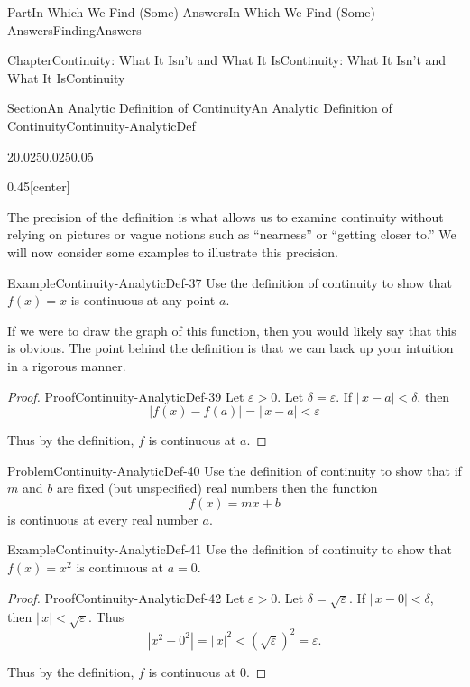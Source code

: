\documentclass[oneside,10pt,]{book}
\numberwithin{equation}{part}
\newcommand{\abs}[1]{\left|#1\right|}
\newcommand{\eps}{\varepsilon}
\newcommand{\lt}{<}
\begin{document}
\begin{partptx}{Part}{In Which We Find (Some) Answers}{}{In Which We Find (Some) Answers}{}{}{FindingAnswers}
\begin{chapterptx}{Chapter}{Continuity: What It Isn't and What It Is}{}{Continuity: What It Isn't and What It Is}{}{}{Continuity}
\begin{sectionptx}{Section}{An Analytic Definition of Continuity}{}{An Analytic Definition of Continuity}{}{}{Continuity-AnalyticDef}
\begin{sidebyside}{2}{0.025}{0.025}{0.05}
\begin{sbspanel}{0.45}[center]
\end{sbspanel}%
\end{sidebyside}%
The precision of the definition is what allows us to examine continuity without relying on pictures or vague notions such as ``nearness'' or ``getting closer to.'' We will now consider some examples to illustrate this precision.%
\begin{example}{Example}{}{Continuity-AnalyticDef-37}%
Use the definition of continuity to show that \(f(x)=x\) is continuous at any point \(a\).%
\end{example}
If we were to draw the graph of this function, then you would likely say that this is obvious.  The point behind the definition is that we can back up your intuition in a rigorous manner.%
\begin{proof}{Proof}{}{Continuity-AnalyticDef-39}
Let \(\eps>0\). Let \(\delta=\eps\). If \(|\,x-a|\lt \delta\), then%
\begin{equation*}
|f(x)-f(a)|=|\,x-a|\lt \eps
\end{equation*}
%
\par
Thus by the definition, \(f\) is continuous at \(a\).%
\end{proof}
\begin{problem}{Problem}{}{Continuity-AnalyticDef-40}%
 Use the definition of continuity to show that if \(m\) and \(b\) are fixed (but unspecified) real numbers then the function%
\begin{equation*}
f(x) = mx+b
\end{equation*}
is continuous at every real number \(a\).%
\end{problem}
\begin{example}{Example}{}{Continuity-AnalyticDef-41}%
Use the definition of continuity to show that \(f(x)=x^2\) is continuous at \(a=0\).%
\end{example}
\begin{proof}{Proof}{}{Continuity-AnalyticDef-42}
Let \(\eps>0\). Let \(\delta=\sqrt{\eps}\). If \(|\,x-0|\lt \delta\), then \(|\,x|\lt \sqrt{\eps}\). Thus%
\begin{equation*}
\abs{x^2-0^2}=|\,x|^2\lt \left(\sqrt{\eps}\right)^2=\eps\text{.}
\end{equation*}
%
\par
Thus by the definition, \(f\) is continuous at \(0\).%
\end{proof}

\end{sectionptx}
\end{chapterptx}
\end{partptx}
\end{document}
